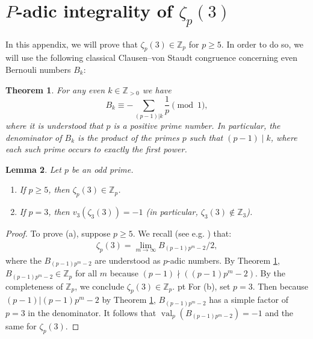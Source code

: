 \documentclass[reqno]{amsart}
\numberwithin{equation}{section}
\numberwithin{equation}{section}
\numberwithin{equation}{section}
\newtheorem{thm}{Theorem}[section]
\newtheorem{lemma}[thm]{Lemma}
\theoremstyle{definition}
\theoremstyle{remark}
\theoremstyle{remark}
\begin{document}
\section{$P$-adic integrality of $\zeta_p(3)$}
In this appendix, we will prove that $\zeta_p(3) \in \mathbb{Z}_p$ for $p \ge 5$. In order to do so, we will use the following classical Clausen–von
Staudt congruence \cite[Theorem 9.5.14, Corollary 9.5.15]{cohen-vol2} concerning even Bernouli numbers $B_k$:   
\begin{thm} \label{thm:ClausenvonStaudt}
For any even $k \in \mathbb{Z}_{>0}$ we have
\[
B_k \equiv -\sum_{(p-1)|k} \frac{1}{p} \pmod{1},
\]
where it is understood that $p$ is a positive prime number. In particular, the denominator of $B_k$ is the product of the primes $p$ such that $(p-1) \mid k$, where each such prime occurs to exactly the first power.
\end{thm}
\begin{lemma}\label{lem:pintegrality}
Let $p$ be an odd prime.
\begin{enumerate}
    \item[(a)] If $p \ge 5$, then $\zeta_p(3) \in \mathbb{Z}_p$.
    \item[(b)] If $p = 3$, then $v_3(\zeta_3(3)) = -1$ (in particular, $\zeta_3(3) \notin \mathbb{Z}_3$).
\end{enumerate}
\end{lemma}
\begin{proof}
To prove (a), suppose $p \geq 5$. We recall (see e.g. \cite[pg. 73]{candelas}) that: \begin{align} \zeta_p(3)= \operatorname{lim}_{m\to \infty} B_{(p-1)p^m-2}/2, \end{align} where the $B_{(p-1)p^m-2}$ are understood as $p$-adic numbers. By Theorem \ref{thm:ClausenvonStaudt}, $B_{(p-1)p^m-2} \in \mathbb{Z}_p$ for all $m$ because $(p-1)\nmid ((p-1)p^m-2)$. By the completeness of $\mathbb{Z}_p$, we conclude $\zeta_p(3) \in \mathbb{Z}_p.$  pt
For (b), set $p=3$. Then because $(p-1)|(p-1)p^m-2$ by Theorem \ref{thm:ClausenvonStaudt}, $B_{(p-1)p^m-2}$ has a simple factor of $p=3$ in the denominator. It follows that $\operatorname{val}_p(B_{(p-1)p^m-2})=-1$ and the same for $\zeta_p(3)$.
\end{proof}



\end{document}
